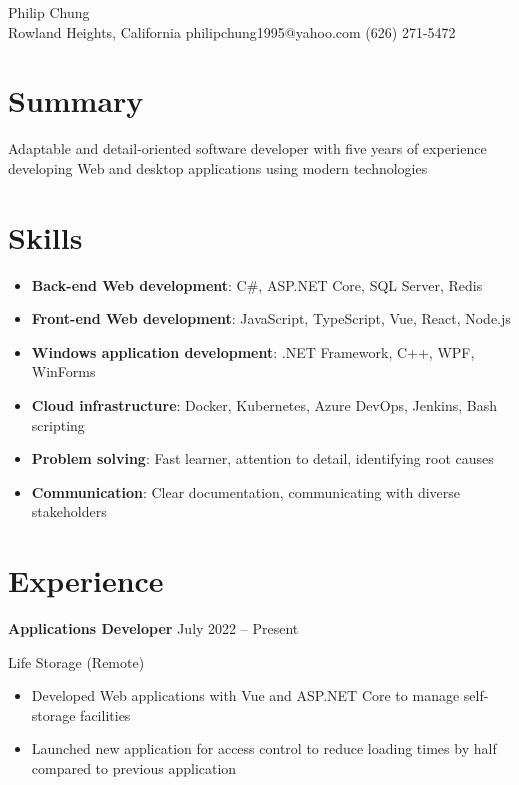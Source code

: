 \documentclass[11pt]{article}
\newcommand{\titleheader}[2]{\textbf{#1} \symbol{"B7} #2}
\newcommand{\locheader}[2]{#1 (#2)}
\begin{document}
	\begin{center}
		{\LARGE Philip Chung} \\ \vspace{0.5em}
		Rowland Heights, California  philipchung1995@yahoo.com  (626) 271-5472
	\end{center}

	\section*{Summary}

	Adaptable and detail-oriented software developer with five years of experience developing Web and desktop applications using modern technologies

	\section*{Skills}

	\newcommand{\skillitem}[2]{\item \textbf{#1}: #2}

	\begin{itemize}
		\skillitem{Back-end Web development}{C\#, ASP.NET Core, SQL Server, Redis}
		\skillitem{Front-end Web development}{JavaScript, TypeScript, Vue, React, Node.js}
		\skillitem{Windows application development}{.NET Framework, C++, WPF, WinForms}
		\skillitem{Cloud infrastructure}{Docker, Kubernetes, Azure DevOps, Jenkins, Bash scripting}
		\skillitem{Problem solving}{Fast learner, attention to detail, identifying root causes}
		\skillitem{Communication}{Clear documentation, communicating with diverse stakeholders}
	\end{itemize}

	\section*{Experience}

	\titleheader{Applications Developer}{July 2022 -- Present}

	\locheader{Life Storage}{Remote}

	\begin{itemize}
		\item Developed Web applications with Vue and ASP.NET Core to manage self-storage facilities
		\item Launched new application for access control to reduce loading times by half compared to previous application
	\end{itemize}
\end{document}
